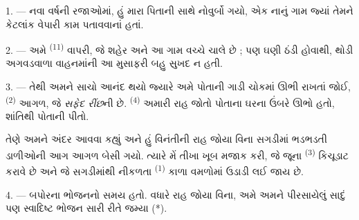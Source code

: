%


\VUsaut{4.0mm}
\VUsaut{3.0mm}
\VUfilet{16mm}
\VUsaut{5.6mm}
\VUsaut{3.0mm}

\VUsaut{3.0mm}

\VUsaut{4.0mm}

1. --- નવા વર્ષની રજાઓમાં, હું મારા પિતાની સાથે નોવુર્બો ગયો, એક નાનું
ગામ જ્યાં તેમને કેટલાંક વેપારી કામ પતાવવાનાં હતાં.

2. --- અમે  \textsuperscript{(11)} વાપરી, જે શહેર અને
આ ગામ વચ્ચે ચાલે છે ; પણ ઘણી ઠંડી હોવાથી, થોડી અગવડવાળા વાહનમાંની આ
મુસાફરી બહુ સુખદ ન હતી.

3. --- તેથી અમને સાચો આનંદ થયો જ્યારે અમે  પોતાની
ગાડી ચોકમાં ઊભી રાખતાં જોઈ,  \textsuperscript{(2)}
આગળ, જે \textit{સફેદ રીંછ}ની છે. 
\textsuperscript{(4)} અમારી રાહ જોતો પોતાના ઘરના ઉંબરે ઊભો હતો, શાંતિથી
પોતાની  પીતો.

તેણે અમને અંદર આવવા કહ્યું અને હું વિનંતીની રાહ જોયા વિના સગડીમાં
ભડભડતી ડાળીઓની આગ આગળ બેસી ગયો. ત્યારે મેં તીખા  ખૂબ મજાક કરી, જે જૂના  \textsuperscript{(3)}
કિચૂડાટ કરાવે છે અને જે સગડીમાંથી નીકળતા 
\textsuperscript{(1)} કાળા વમળોમાં ઉડાડી લઈ જાય છે.

4. --- બપોરના ભોજનનો સમય હતો. વધારે રાહ જોયા વિના, અમે અમને પીરસાયેલું
સાદું પણ સ્વાદિષ્ટ ભોજન સારી રીતે જમ્યા (*).

